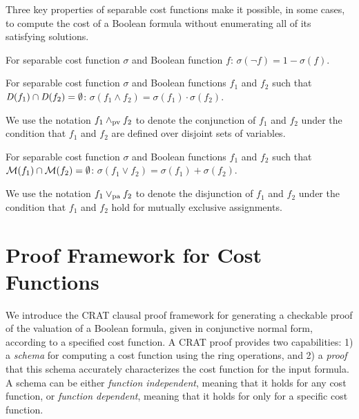 \documentclass{llncs}
\newcommand{\pand}{\mathbin{\land_{\rm pv}}}
\newcommand{\por}{\mathbin{\lor_{\rm pa}}}
\newcommand{\interpset}[1]{{\cal M}(#1)}
\newcommand{\cost}{\sigma}
\newcommand{\depend}{{\it D}}
\begin{document}
Three key properties of separable cost functions make it possible, in
some cases, to compute the cost of a Boolean formula without
enumerating all of its satisfying solutions.


\begin{lemma}[Complementation]
\label{lemma:complementation}
  For separable cost function $\cost$ and Boolean function $f$:
  $\cost(\neg f) = 1 - \cost(f)$.
\end{lemma}

\begin{lemma}
\label{lemma:conjunction}
  For separable cost function $\cost$ and Boolean functions $f_1$ and $f_2$ such that $\depend(f_1) \cap \depend(f_2) = \emptyset$:
    $\cost(f_1 \land f_2) = \cost(f_1) \cdot \cost(f_2)$.
\end{lemma}
We use the notation $f_1 \pand f_2$ to denote the conjunction of $f_1$ and
$f_2$ under the condition that $f_1$ and $f_2$ are defined over
disjoint sets of variables.

\begin{lemma}
\label{lemma:disjunction}
  For separable cost function $\cost$ and Boolean functions $f_1$ and $f_2$ such that $\interpset{f_1} \cap \interpset{f_2} = \emptyset$:
    $\cost(f_1 \lor f_2) = \cost(f_1) + \cost(f_2)$.
\end{lemma}
We use the notation $f_1 \por f_2$ to denote the disjunction of $f_1$ and $f_2$ under the
condition that $f_1$ and $f_2$ hold for mutually exclusive assignments.

\section{Proof Framework for Cost Functions}

We introduce the CRAT clausal proof framework for generating a
checkable proof of the valuation of a Boolean formula, given in
conjunctive normal form, according to a specified cost function.  A
CRAT proof provides two capabilities: 1) a {\em schema} for computing a cost
function using the ring operations, and 2) a {\em proof} that this schema
accurately characterizes the cost function for the input formula.
A schema can be either {\em function independent}, meaning that it holds
for any cost function, or {\em function dependent}, meaning that
it holds for only for a specific cost function.
\end{document}
